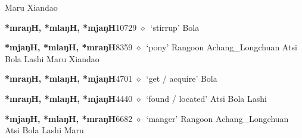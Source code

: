 \begin{list}{}{\leftmargin=1.5em \itemindent=-1.5em}
\hspace{1ex}
         Maru 
\hspace{1ex}
         Xiandao 
  \item {\footnotesize \textbf{*mraŋH, *mlaŋH, *mjaŋH}}{\tiny 10729}
\hspace{1ex}
         $\diamond$~`stirrup'
         Bola 
  \item {\footnotesize \textbf{*mjaŋH, *mlaŋH, *mraŋH}}{\tiny 8359}
\hspace{1ex}
         $\diamond$~`pony'
         Rangoon 
\hspace{1ex}
         Achang\_Longchuan 
\hspace{1ex}
         Atsi 
\hspace{1ex}
         Bola 
\hspace{1ex}
         Lashi 
\hspace{1ex}
         Maru 
\hspace{1ex}
         Xiandao 
  \item {\footnotesize \textbf{*mraŋH, *mlaŋH, *mjaŋH}}{\tiny 4701}
\hspace{1ex}
         $\diamond$~`get / acquire'
         Bola 
  \item {\footnotesize \textbf{*mraŋH, *mlaŋH, *mjaŋH}}{\tiny 4440}
\hspace{1ex}
         $\diamond$~`found / located'
         Atsi 
\hspace{1ex}
         Bola 
\hspace{1ex}
         Lashi 
  \item {\footnotesize \textbf{*mjaŋH, *mlaŋH, *mraŋH}}{\tiny 6682}
\hspace{1ex}
         $\diamond$~`manger'
         Rangoon 
\hspace{1ex}
         Achang\_Longchuan 
\hspace{1ex}
         Atsi 
\hspace{1ex}
         Bola 
\hspace{1ex}
         Lashi 
\hspace{1ex}
         Maru 
  \end{list}
